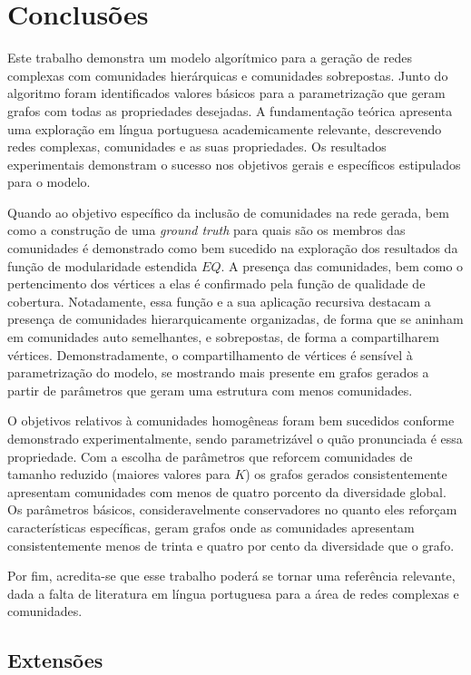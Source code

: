 \documentclass[notes.tex]{subfiles}
\begin{document}
\chapter{Conclusões}

Este trabalho demonstra um modelo algorítmico para a geração de redes complexas com comunidades hierárquicas e comunidades sobrepostas.
Junto do algoritmo foram identificados valores básicos para a parametrização que geram grafos com todas as propriedades desejadas.
A fundamentação teórica apresenta uma exploração em língua portuguesa academicamente relevante, descrevendo redes complexas, comunidades e as suas propriedades.
Os resultados experimentais demonstram o sucesso nos objetivos gerais e específicos estipulados para o modelo.

Quando ao objetivo específico da inclusão de comunidades na rede gerada, bem como a construção de uma \emph{ground truth} para quais são os membros das comunidades é demonstrado como bem sucedido na exploração dos resultados da função de modularidade estendida $EQ$.
A presença das comunidades, bem como o pertencimento dos vértices a elas é confirmado pela função de qualidade de cobertura.
Notadamente, essa função e a sua aplicação recursiva destacam a presença de comunidades hierarquicamente organizadas, de forma que se aninham em comunidades auto semelhantes, e sobrepostas, de forma a compartilharem vértices.
Demonstradamente, o compartilhamento de vértices é sensível à parametrização do modelo, se mostrando mais presente em grafos gerados a partir de parâmetros que geram uma estrutura com menos comunidades.

O objetivos relativos à comunidades homogêneas foram bem sucedidos conforme demonstrado experimentalmente, sendo parametrizável o quão pronunciada é essa propriedade.
Com a escolha de parâmetros que reforcem comunidades de tamanho reduzido (maiores valores para $K$) os grafos gerados consistentemente apresentam comunidades com menos de quatro porcento da diversidade global.
Os parâmetros básicos, consideravelmente conservadores no quanto eles reforçam características específicas, geram grafos onde as comunidades apresentam consistentemente menos de trinta e quatro por cento da diversidade que o grafo.

Por fim, acredita-se que esse trabalho poderá se tornar uma referência relevante, dada a falta de literatura em língua portuguesa para a área de redes complexas e comunidades.

\section{Extensões}
\end{document}
